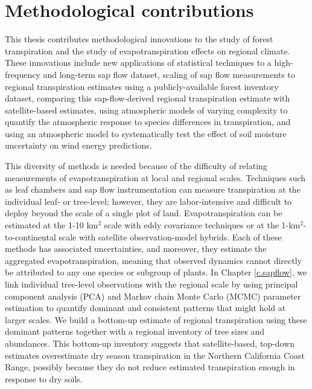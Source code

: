 \section{Methodological contributions}

This thesis contributes methodological innovations to the study of forest transpiration and the study of evapotranspiration effects on regional climate.  These innovations include new applications of statistical techniques to a high-frequency and long-term sap flow dataset, scaling of sap flow measurements to regional transpiration estimates using a publicly-available forest inventory dataset, comparing this sap-flow-derived regional transpiration estimate with satellite-based estimates, using atmospheric models of varying complexity to quantify the atmospheric response to species differences in transpiration, and using an atmospheric model to systematically test the effect of soil moisture uncertainty on wind energy predictions.

This diversity of methods is needed because of the difficulty of relating measurements of evapotranspiration at local and regional scales.  Techniques such as leaf chambers and sap flow instrumentation can measure transpiration at the individual leaf- or tree-level; however, they are labor-intensive and difficult to deploy beyond the scale of a single plot of land.  Evapotranspiration can be estimated at the 1-10 km$^2$ scale with eddy covariance techniques or at the 1-km$^2$-to-continental scale with satellite observation-model hybrids.  Each of these methods has associated uncertainties, and moreover, they estimate the aggregated evapotranspiration, meaning that observed dynamics cannot directly be attributed to any one species or subgroup of plants.  In Chapter \ref{c.sapflow}, we link individual tree-level observations with the regional  scale by using principal component analysis (PCA) and Markov chain Monte Carlo (MCMC) parameter estimation to quantify dominant and consistent patterns that might hold at larger scales.  We build a bottom-up estimate of regional transpiration using these dominant patterns together with a regional inventory of tree sizes and abundances.  This bottom-up inventory suggests that satellite-based, top-down estimates overestimate dry season transpiration in the Northern California Coast Range, possibly because they do not reduce estimated transpiration enough in response to dry soils.

